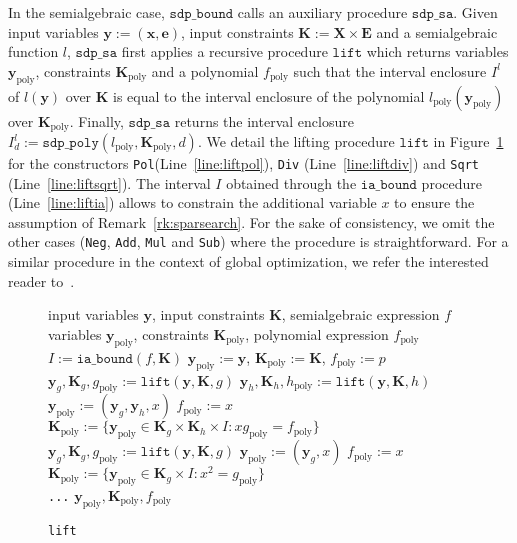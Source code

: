\documentclass[preprint]{sigplanconf}
\newcommand{\code}[1]{\lstinline{#1}}
\newcommand{\x}{\mathbf{x}}
\newcommand{\e}{\mathbf{e}}
\newcommand{\y}{\mathbf{y}}
\newcommand{\f}{\mathbf{f}}
\def\f{f}
\def\E{\mathbf{E}}
\def\K{\mathbf{K}}
\def\X{\mathbf{X}}
\newcommand{\iaboundfun}[2]{\mathtt{ia\_bound}(#1, #2)}
\newcommand{\iabound}{\mathtt{ia\_bound}}
\newcommand{\sdpbound}{\mathtt{sdp\_bound}}
\newcommand{\sdppolyfun}[3]{\mathtt{sdp\_poly}(#1, #2, #3)}
\newcommand{\liftfun}[3]{\mathtt{lift}(#1, #2, #3)}
\newcommand{\lift}{\mathtt{lift}}
\newcommand{\poly}{_\text{poly}}
\newcommand{\sdpsa}{\mathtt{sdp\_sa}}
\theoremstyle{plain}
\begin{document}
In the semialgebraic case, $\sdpbound$ calls an auxiliary procedure $\sdpsa$. 
Given input variables $\y := (\x,\e)$, input constraints $\K := \X \times \E$ and a 
semialgebraic function $l$,  $\sdpsa$ first applies a recursive procedure $\lift$ 
which returns variables $\y\poly$, constraints $\K\poly$ and a polynomial $f\poly$ such that the 
interval enclosure $I^l$ of $l(\y)$ over $\K$ is equal to the interval enclosure of 
the polynomial $l\poly(\y\poly)$ over $\K\poly$. 
Finally, $\sdpsa$ returns the interval enclosure $I^l_d := \sdppolyfun{l\poly}{\K\poly}{d}$. We detail the lifting procedure $\lift$ in Figure~\ref{alg:lift} for the constructors \code{Pol}(Line~\eqref{line:liftpol}), \code{Div} (Line~\eqref{line:liftdiv}) and \code{Sqrt} (Line~\eqref{line:liftsqrt}). 
The interval $I$ obtained through the $\iabound$ procedure (Line~\eqref{line:liftia}) allows to constrain the additional variable $x$ to ensure the assumption of Remark~\ref{rk:sparsearch}.
For the sake of consistency, we omit the other cases (\code{Neg}, \code{Add}, \code{Mul} and \code{Sub}) where the procedure is straightforward. For a similar procedure in the context of global optimization, we refer the interested reader to~\cite[Chapter 2]{MagronPhD}.

\begin{figure}[!ht]
\begin{algorithmic}[1]                 
\Require input variables $\y$, input constraints $\K$, semialgebraic expression $f$
\Ensure variables $\y\poly$, constraints $\K\poly$, polynomial expression $f\poly$
    \State $I := \iaboundfun{f}{\K}$ \label{line:liftia}
	 \label{line:liftpol} $\y\poly := \y$, $\K\poly := \K$, $\f\poly := p$
	 \label{line:liftdiv} 
	\State $\y_g, \K_g, g\poly := \liftfun{\y}{\K}{g}$ 
	\State $\y_h, \K_h, h\poly := \liftfun{\y}{\K}{h}$
    \State $\y\poly := (\y_g,\y_h,x)$ \hspace{1cm} $f\poly := x$ 
	\State $\K\poly := \{\y\poly \in \K_g \times \K_h \times I : x g\poly = f\poly \}$
	 \label{line:liftsqrt} 
	\State $\y_g, \K_g, g\poly := \liftfun{\y}{\K}{g}$ 
	\State $\y\poly := (\y_g,x)$ \hspace{1cm} $f\poly := x$ 
	\State $\K\poly := \{\y\poly \in \K_g \times I : x^2 = g\poly \}$\\
\code{...}
	\EndIf
%
\State \Return $\y\poly, \K\poly, f\poly$
\end{algorithmic}
\caption{\code{lift}}
\label{alg:lift}
\end{figure}
\end{document}
